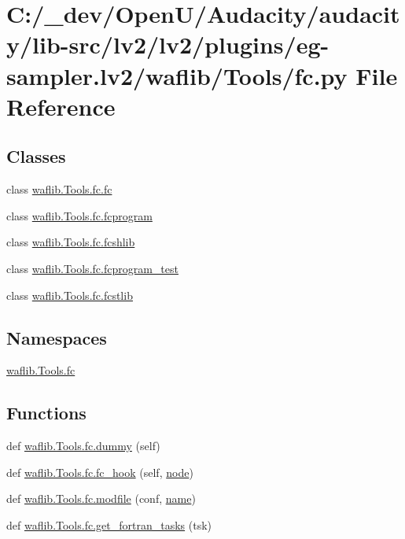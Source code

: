 \hypertarget{lv2_2plugins_2eg-sampler_8lv2_2waflib_2_tools_2fc_8py}{}\section{C\+:/\+\_\+dev/\+Open\+U/\+Audacity/audacity/lib-\/src/lv2/lv2/plugins/eg-\/sampler.lv2/waflib/\+Tools/fc.py File Reference}
\label{lv2_2plugins_2eg-sampler_8lv2_2waflib_2_tools_2fc_8py}
\subsection*{Classes}
\begin{DoxyCompactItemize}
\item 
class \hyperlink{classwaflib_1_1_tools_1_1fc_1_1fc}{waflib.\+Tools.\+fc.\+fc}
\item 
class \hyperlink{classwaflib_1_1_tools_1_1fc_1_1fcprogram}{waflib.\+Tools.\+fc.\+fcprogram}
\item 
class \hyperlink{classwaflib_1_1_tools_1_1fc_1_1fcshlib}{waflib.\+Tools.\+fc.\+fcshlib}
\item 
class \hyperlink{classwaflib_1_1_tools_1_1fc_1_1fcprogram__test}{waflib.\+Tools.\+fc.\+fcprogram\+\_\+test}
\item 
class \hyperlink{classwaflib_1_1_tools_1_1fc_1_1fcstlib}{waflib.\+Tools.\+fc.\+fcstlib}
\end{DoxyCompactItemize}
\subsection*{Namespaces}
\begin{DoxyCompactItemize}
\item 
 \hyperlink{namespacewaflib_1_1_tools_1_1fc}{waflib.\+Tools.\+fc}
\end{DoxyCompactItemize}
\subsection*{Functions}
\begin{DoxyCompactItemize}
\item 
def \hyperlink{namespacewaflib_1_1_tools_1_1fc_a27d355b521fb9e2bf9fa51b4c5b86a75}{waflib.\+Tools.\+fc.\+dummy} (self)
\item 
def \hyperlink{namespacewaflib_1_1_tools_1_1fc_a32c4c535596617f7d93fadd0607f18eb}{waflib.\+Tools.\+fc.\+fc\+\_\+hook} (self, \hyperlink{structnode}{node})
\item 
def \hyperlink{namespacewaflib_1_1_tools_1_1fc_ae8fd3a39f47bdf4cb2e5d16cbdacd4e0}{waflib.\+Tools.\+fc.\+modfile} (conf, \hyperlink{lib_2expat_8h_a1b49b495b59f9e73205b69ad1a2965b0}{name})
\item 
def \hyperlink{namespacewaflib_1_1_tools_1_1fc_a042f42940a7e5040b3d6e9c3dd3df7f4}{waflib.\+Tools.\+fc.\+get\+\_\+fortran\+\_\+tasks} (tsk)
\end{DoxyCompactItemize}
